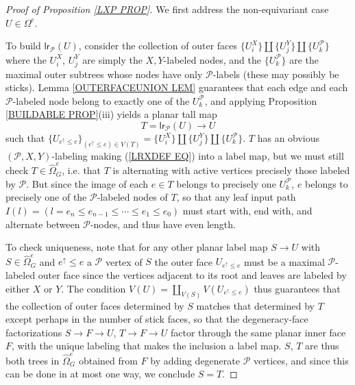 \documentclass[a4paper,10pt]{article}%
\begin{document}
\begin{proof}[Proof of Proposition \ref{LXP PROP}]
	We first address the non-equivariant case $U \in \Omega^e$.

	To build $\mathsf{lr}_{\mathcal{P}}(U)$, consider the collection of outer faces
	$\{U_i^X\} \amalg \{U_j^Y\} \amalg \{U_k^{\mathcal{P}}\}$
where the $U_i^X$, $U_j^Y$ are simply the $X,Y$-labeled nodes,
and the $\{U_k^{\mathcal{P}}\}$ are the maximal outer subtrees whose nodes have only $\mathcal{P}$-labels (these may possibly be sticks). 
Lemma \ref{OUTERFACEUNION LEM} guarantees that 
each edge and each $\mathcal{P}$-labeled node belong to exactly
one of the $U_k^{\mathcal{P}}$, and applying 
Proposition \ref{BUILDABLE PROP}(iii)
yields a planar tall map
\begin{equation}\label{LRXDEF EQ}
T = \mathsf{lr}_{\mathcal{P}}(U) \to U
\end{equation}
such that $\{U_{e^{\uparrow} \leq e}\}_{(e^{\uparrow} \leq e) \in V(T)}
 = \{U_i^X\} \amalg \{U_j^Y\} \amalg 
 \{U_k^{\mathcal{P}}\}$. 
 $T$ has an obvious $(\mathcal{P},X,Y)$-labeling making 
(\ref{LRXDEF EQ}) into a label map, but we must still check $T \in \widehat{\Omega}^{e}_G$, i.e. that 
$T$ is alternating with active vertices precisely those labeled by $\mathcal{P}$.
But since the image of each $e \in T$
belongs to precisely one $U_k^{\mathcal{P}}$,
$e$ belongs to precisely one of the $\mathcal{P}$-labeled nodes of $T$, so that any leaf input path
$I(l) = (l = e_n \leq e_{n-1} \leq \cdots \leq e_1 \leq e_0)$
must start with, end with, and alternate between 
$\mathcal{P}$-nodes, and thus have even length.

To check uniqueness, note that for any other planar label map $S \to U$ with $S \in \widehat{\Omega}_G^e$
and $e^{\uparrow} \leq e$ a $\mathcal{P}$ vertex of $S$
the outer face 
$U_{e^{\uparrow} \leq e}$
must be a maximal 
$\mathcal{P}$-labeled outer face since the vertices adjacent to its root and leaves are labeled by either $X$ or $Y$.
The condition 
$V(U) = \coprod_{V(S)} V(U_{e^{\uparrow} \leq e})$
thus guarantees that the collection of outer faces determined by $S$ matches that determined by $T$
except perhaps in the number of stick faces, so that 
the degeneracy-face factorizations
$S \to F \to U$, $T \to F \to U$
factor through the same planar inner face $F$, with the  unique labeling that makes the inclusion a label map.
$S$, $T$ are thus both trees in $\widehat{\Omega}_G^e$ obtained from $F$ by adding degenerate $\mathcal{P}$ vertices, 
and since this can be done in at most one way, we conclude 
$S=T$. 


\end{proof}
\end{document}

